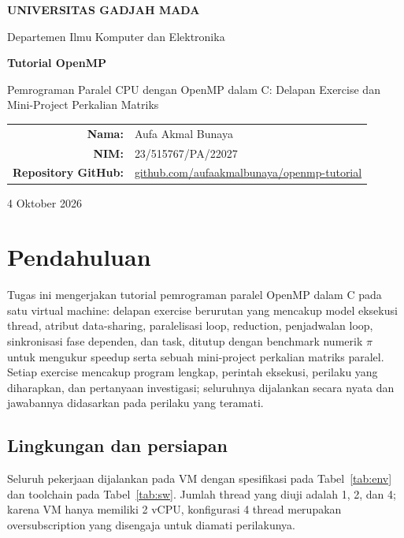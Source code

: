 \documentclass[11pt,a4paper]{article}
\begin{document}
\begin{titlepage}
\centering
\vspace*{1.3cm}
{\Large\bfseries UNIVERSITAS GADJAH MADA\par}
\vspace{0.4cm}
{\large Departemen Ilmu Komputer dan Elektronika\par}
\vspace{2.0cm}
{\Huge\bfseries Tutorial OpenMP\par}
\vspace{0.5cm}
{\large Pemrograman Paralel CPU dengan OpenMP dalam C: Delapan Exercise dan Mini-Project Perkalian Matriks\par}
\vfill
\begin{tabular}{>{\bfseries}rl}
Nama: & Aufa Akmal Bunaya\\
NIM: & 23/515767/PA/22027\\
Repository GitHub: & \href{https://github.com/aufaakmalbunaya/openmp-tutorial}{github.com/aufaakmalbunaya/openmp-tutorial}
\end{tabular}
\vfill
{\large 4 Oktober 2026\par}
\end{titlepage}

\tableofcontents
\newpage

\section{Pendahuluan}
Tugas ini mengerjakan tutorial pemrograman paralel OpenMP dalam C pada satu virtual machine: delapan exercise berurutan yang mencakup model eksekusi thread, atribut data-sharing, paralelisasi loop, reduction, penjadwalan loop, sinkronisasi fase dependen, dan task, ditutup dengan benchmark numerik $\pi$ untuk mengukur speedup serta sebuah mini-project perkalian matriks paralel. Setiap exercise mencakup program lengkap, perintah eksekusi, perilaku yang diharapkan, dan pertanyaan investigasi; seluruhnya dijalankan secara nyata dan jawabannya didasarkan pada perilaku yang teramati.

\subsection{Lingkungan dan persiapan}
Seluruh pekerjaan dijalankan pada VM dengan spesifikasi pada Tabel~\ref{tab:env} dan toolchain pada Tabel~\ref{tab:sw}. Jumlah thread yang diuji adalah 1, 2, dan 4; karena VM hanya memiliki 2 vCPU, konfigurasi 4 thread merupakan oversubscription yang disengaja untuk diamati perilakunya.
\end{document}
